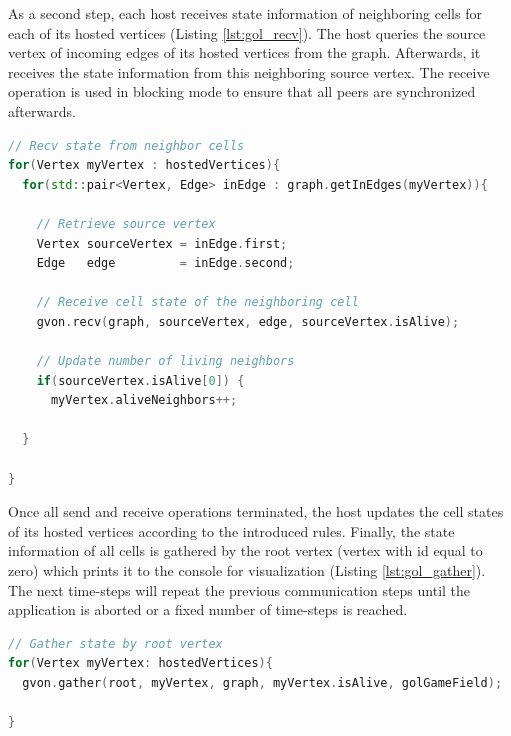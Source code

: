 \noindent As a second step, each host receives state information of
neighboring cells for each of its hosted vertices (Listing
\ref{lst:gol_recv}). The host queries the source vertex of incoming
edges of its hosted vertices from the graph. Afterwards, it receives
the state information from this neighboring source vertex.  The
receive operation is used in blocking mode to ensure that all peers
are synchronized afterwards.

\begin{minipage}[t]{\textwidth} 
\begin{lstlisting}[language=C++, label=lst:gol_recv, caption={A host receives the cell state of neighboring vertices of its hosted vertices. The information of neighboring vertices is retrieved from the graph. The cell states are received in the blocking variant to synchronize the hosts.}]
// Recv state from neighbor cells
for(Vertex myVertex : hostedVertices){
  for(std::pair<Vertex, Edge> inEdge : graph.getInEdges(myVertex)){

    // Retrieve source vertex
    Vertex sourceVertex = inEdge.first;
    Edge   edge         = inEdge.second;

    // Receive cell state of the neighboring cell    
    gvon.recv(graph, sourceVertex, edge, sourceVertex.isAlive);

    // Update number of living neighbors
    if(sourceVertex.isAlive[0]) { 
      myVertex.aliveNeighbors++;

  }

}
\end{lstlisting}
\end{minipage}



\noindent Once all send and receive operations terminated, the host
updates the cell states of its hosted vertices according to the introduced rules. Finally, the
state information of all cells is gathered by the root vertex (vertex
with id equal to zero) which prints it to the console for visualization (Listing
\ref{lst:gol_gather}). The next time-steps will repeat the
previous communication steps until the application is aborted or a
fixed number of time-steps is reached.

\begin{minipage}[t]{\textwidth} 
  \begin{lstlisting}[language=C++, label=lst:gol_gather, caption={The cell states of all vertices of the GoL graph is
    gathered by a host that hosts the root vertex.} ]
// Gather state by root vertex
for(Vertex myVertex: hostedVertices){
  gvon.gather(root, myVertex, graph, myVertex.isAlive, golGameField);

}
\end{lstlisting}
\end{minipage}


